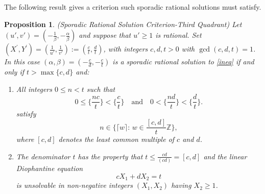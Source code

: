\documentclass[12pt,letterpaper, reqno]{amsart}
\newtheorem{prop}[thm]{Proposition}
\theoremstyle{definition}
\theoremstyle{remark}
\newcommand{\ZZ}{\ensuremath{\mathbb{Z}}}
\newcommand{\uu}{{u'}}
\newcommand{\vv}{{v'}}
\begin{document}
The following result  gives a criterion such sporadic rational
solutions must satisfy.

\begin{prop} \label{prop:514aa}
{ \rm (Sporadic Rational Solution Criterion-Third Quadrant)} 
Let  $(\uu, \vv) = (-\frac{1}{\beta}, -\frac{\alpha}{\beta})$ and suppose that ${\uu} \ge  1$ is rational.
Set $(X^{'}, Y^{'}) = (\frac{1}{\uu}, \frac1{\vv}) := (\frac{c}{t}, \frac{d}{t})$, with integers $c,d, t >0$ with $\gcd(c, d, t)=1$.
In this case $(\alpha, \beta)=(- \frac{c}{d}, - \frac{c}{t})$ is a sporadic rational solution to \eqref{ineq}  if and only if 
$t > \max\{ c, d\}$ and:
\begin{enumerate}
\item[(i)]
All integers  $0 \le n < t$ such that
$$
0 \le  \{ \frac{nc}{t}\} <  \{ \frac{c}{t}\} \quad \mbox{and} \quad  0 < \{ \frac{nd}{t}\} <  \{ \frac{d}{t}\}.
$$
satisfy 
\begin{equation}\label{eq:512-2}
n \in \{ \lceil w\rceil: \, w \in \frac{[c,d]}{t} \ZZ\}, 
\end{equation}
  where $[c,d]$ denotes  the least common
multiple of $c$ and $d$.
\item[(ii)]
The denominator $t$ has the property  that $t \le \frac{cd}{(cd)} = {[c,d]}$ and the  linear
Diophantine equation 
\begin{equation}\label{eq:Frob1}
c X_1 + dX_2= t
\end{equation}
is unsolvable in non-negative integers $(X_1,X_2)$ having $X_2 \ge 1$. 
\end{enumerate}
\end{prop}
\end{document}
